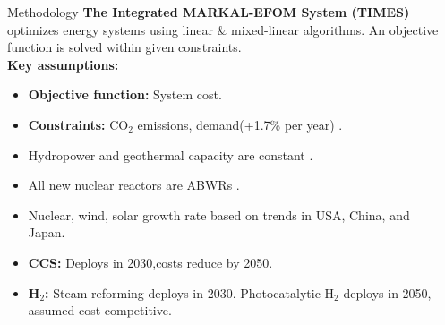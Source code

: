 \documentclass[final]{beamer}
\newlength{\onecolwid}
\begin{document}
\begin{frame}[t]
\begin{columns}
\begin{column}{\onecolwid}
\end{column} %
%

\begin{column}{\onecolwid} %

\begin{block}{Methodology}
        \textbf{The Integrated MARKAL-EFOM System (TIMES)} 
        \cite{loulou_documentation_2005} 
        \cite{seebregts_energy/environmental_2002} optimizes energy systems 
        using linear \& mixed-linear algorithms. An objective 
        function is solved within given constraints.\\
\textbf{Key assumptions:}
\begin{itemize}
        \item\textbf{Objective function:} System cost. 
        
         \item\textbf{Constraints:} CO$_2$ emissions, demand(+1.7\% per year) \cite{noauthor_electricity_2017}.
         
         \item Hydropower and geothermal capacity are constant \cite{noauthor_energy_2018}.
                  
         \item All new nuclear reactors are ABWRs \cite{rothwell_real_2006}.
         
         \item Nuclear, wind, solar growth rate based on trends in USA, China, and Japan.\cite{noauthor_electricity_2017,noauthor_energy_2018,eia_international_nodate,eia_monthly_2018,iea-pvps_snapshot_2018}
         
         \item \textbf{CCS:} Deploys in 2030,costs reduce by 2050. \cite{kato_energy_2016}
         
         \item \textbf{H$_2$:} Steam reforming deploys in 2030. Photocatalytic H$_2$ deploys in 2050, assumed cost-competitive. \cite{kato_energy_2016} \cite{acar_comparative_2014} \\         
 \end{itemize}   
 


\end{block}
\end{column}
\end{columns}
\end{frame}
\end{document}
